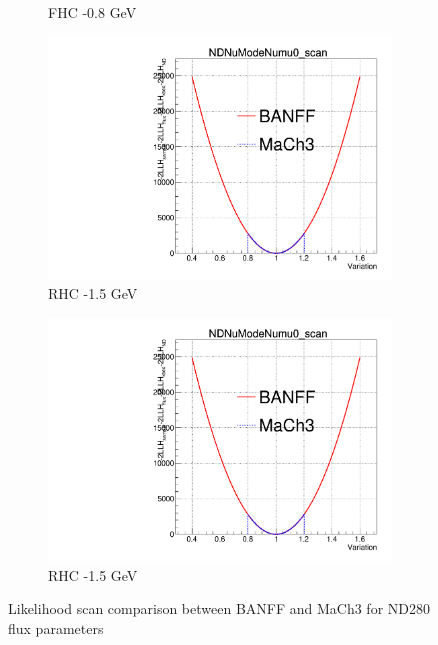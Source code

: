 \begin{figure}[h]
\begin{subfigure}[t]{0.24\textwidth}
		\caption{FHC -0.8 GeV}
	\end{subfigure}
	\begin{subfigure}[t]{0.24\textwidth}
		\includegraphics[width=\textwidth, trim={0mm 0mm 0mm 11mm}, clip,page=36]{figures/mach3/banff/Asimov_scan_20July_flux_Full_LLHscan_18July_BeRPA_U_ND280logL_scan}
		\caption{RHC -1.5 GeV}
	\end{subfigure}
	\begin{subfigure}[t]{0.24\textwidth}
		\includegraphics[width=\textwidth, trim={0mm 0mm 0mm 11mm}, clip,page=47]{figures/mach3/banff/Asimov_scan_20July_flux_Full_LLHscan_18July_BeRPA_U_ND280logL_scan}
		\caption{RHC -1.5 GeV}
	\end{subfigure}
	\caption{Likelihood scan comparison between BANFF and MaCh3 for ND280 flux parameters}
	\label{fig:banff_asimov_scan_ND280_flux}
\end{figure}

